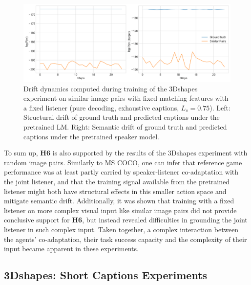 \begin{figure}[h]
	\centering
	\includegraphics[width=\linewidth]{images/3dshapes_structural_semantic_drift_fixedListener_similarFixed_075.png}
	\caption{Drift dynamics computed during training of the 3Dshapes experiment on similar image pairs with fixed matching features with a fixed listener (pure decoding, exhaustive captions, $L_s = 0.75$). Left: Structural drift of ground truth and predicted captions under the pretrained LM. Right: Semantic drift of ground truth and predicted captions under the pretrained speaker model.}
	\label{fig:3dshapes_similarFixed_fixedListener_075_tr_sem_drift}
\end{figure}

To sum up, \textbf{H6} is also supported by the results of the 3Dshapes experiment with random image  pairs. Similarly to MS COCO, one can infer that reference game performance was at least partly carried by speaker-listener co-adaptation with the joint listener, and that the training signal available from the pretrained listener might both have structural effects in this smaller action space and mitigate semantic drift. 
Additionally, it was shown that training with a fixed listener on more complex visual input like similar image pairs did not provide conclusive support for \textbf{H6}, but instead revealed difficulties in grounding the joint listener in such complex input. Taken together, a complex interaction between the agents' co-adaptation, their task success capacity and the complexity of their input became apparent in these experiments.

\subsection{3Dshapes: Short Captions Experiments}
\label{expt:3dshapes_short}

